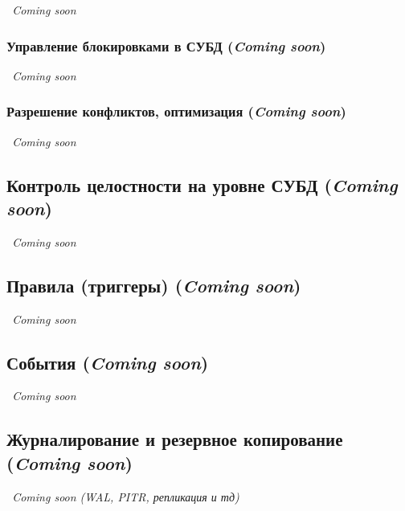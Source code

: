 \textit{~Coming soon}













\subsubsection{Управление блокировками в СУБД (\textit{Coming soon})}

\textit{~Coming soon}

\subsubsection{Разрешение конфликтов, оптимизация (\textit{Coming soon})}

\textit{~Coming soon}





\subsection{Контроль целостности на уровне СУБД (\textit{Coming soon})}
\textit{~Coming soon}





\subsection{Правила (триггеры) (\textit{Coming soon})}

\textit{~Coming soon}





\subsection{События (\textit{Coming soon})}

\textit{~Coming soon}





\subsection{Журналирование и резервное копирование (\textit{Coming soon})}

\textit{~Coming soon (WAL, PITR, репликация и тд)}

























